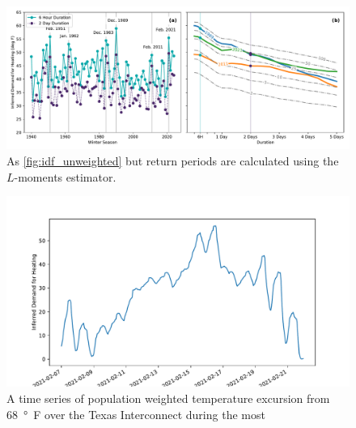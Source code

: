 \documentclass[12pt]{iopart}
\begin{document}
\begin{figure}
  \centering
  \includegraphics[width=\textwidth]{ERCOT_HDD_IDF_plotpos_unweighted.pdf}
  \caption{
    As \cref{fig:idf_unweighted} but return periods are calculated using the $L$-moments estimator.
  }\label{fig:idf_lmoments_unweighted}
\end{figure}

\begin{figure}
  \centering
  \includegraphics[width=\textwidth]{HDD_pop_weighted_ts.pdf}
  \caption{
    A time series of population weighted temperature excursion from \SI{68}{\degree F} over the Texas Interconnect during the most
  }\label{fig:hdd_ts}
\end{figure}
\end{document}
